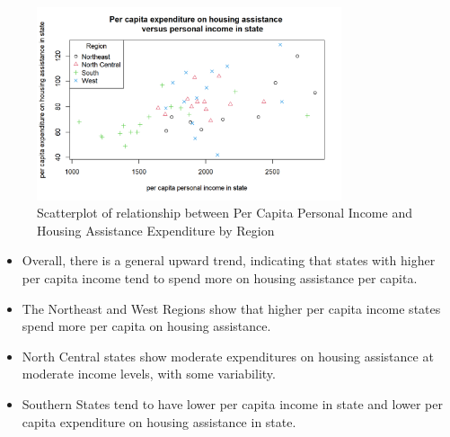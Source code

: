 \documentclass[12pt,letterpaper]{article}
\begin{document}
\newpage

\begin{figure}[H]
	\caption{Scatterplot of relationship between Per Capita Personal Income and Housing Assistance Expenditure by Region}
	\centering
	\includegraphics[width=0.8\textwidth]{Figure_2_3.png}
\end{figure}
\begin{itemize}
\item 
Overall, there is a general upward trend, indicating that states with higher per capita income tend to spend more on housing assistance per capita.
\item 
The Northeast and West Regions show that higher per capita income states spend more per capita on housing assistance.
\item
North Central states show moderate expenditures on housing assistance at moderate income levels, with some variability.
\item 
Southern States tend to have lower per capita income in state and lower per capita expenditure on housing assistance in state. 
\end{itemize}
\end{document}
